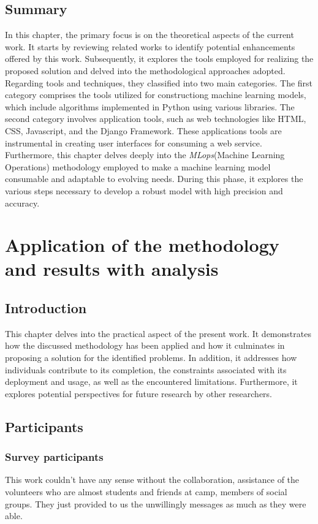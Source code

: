 \documentclass[12pt,a4paper, oneside]{book}
\begin{document}
\section{Summary}
In this chapter, the primary focus is on the theoretical aspects of the current work. It starts by reviewing related works to identify potential enhancements offered by this work. Subsequently, it explores the tools employed for realizing the proposed solution and delved into the methodological approaches adopted.\\

Regarding tools and techniques, they classified into two main categories. The first category comprises the tools utilized for constructiong machine learning models, which include algorithms implemented in Python using various libraries.
The second category involves application tools, such as web technologies like HTML, CSS, Javascript, and the Django Framework. These applications tools are instrumental in creating user interfaces for consuming a web service.\\

Furthermore, this chapter delves deeply into the \textit{MLops}(Machine Learning Operations) methodology employed to make a machine learning model consumable and adaptable to evolving needs. During this phase, it explores the various steps necessary to develop a robust model with high precision and accuracy.
\chapter{Application of the methodology and results with analysis}   
\section{Introduction} 
This chapter delves into the practical aspect of the present work. It demonstrates how the discussed methodology has been applied and how it culminates in proposing a solution for the identified problems. In addition, it addresses how individuals contribute to its completion, the constraints associated with its deployment and usage, as well as the encountered limitations. Furthermore, it explores potential perspectives for future research by other researchers. 
\section{Participants}
\subsection{Survey participants}
This work couldn't have any sense without the collaboration, assistance of the volunteers who are almost students and friends at camp, members of social groups. They just provided to us the unwillingly messages as much as they were able. 
\end{document}
